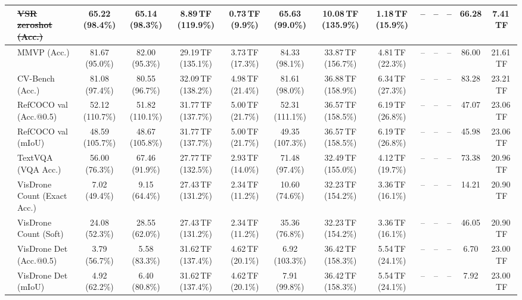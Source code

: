 \begin{table}[t]
\begin{center}
\begin{small}
\begin{sc}
{\begin{tabular}{llcccccccccccc}
& \sout{VSR zeroshot (Acc.)} & 65.22 (98.4\%) & 65.14 (98.3\%) & 8.89\,TF (119.9\%) & 0.73\,TF (9.9\%) & 65.63 (99.0\%) & 10.08\,TF (135.9\%) & 1.18\,TF (15.9\%) & -- & -- & -- & 66.28 & 7.41\,TF \\
\midrule
{}
& MMVP (Acc.) & 81.67 (95.0\%) & 82.00 (95.3\%) & 29.19\,TF (135.1\%) & 3.73\,TF (17.3\%) & 84.33 (98.1\%) & 33.87\,TF (156.7\%) & 4.81\,TF (22.3\%) & -- & -- & -- & 86.00 & 21.61\,TF \\
& CV-Bench (Acc.) & 81.08 (97.4\%) & 80.55 (96.7\%) & 32.09\,TF (138.2\%) & 4.98\,TF (21.4\%) & 81.61 (98.0\%) & 36.88\,TF (158.9\%) & 6.34\,TF (27.3\%) & -- & -- & -- & 83.28 & 23.21\,TF \\
& RefCOCO val (Acc.@0.5) & 52.12 (110.7\%) & 51.82 (110.1\%) & 31.77\,TF (137.7\%) & 5.00\,TF (21.7\%) & 52.31 (111.1\%) & 36.57\,TF (158.5\%) & 6.19\,TF (26.8\%) & -- & -- & -- & 47.07 & 23.06\,TF \\
& RefCOCO val (mIoU) & 48.59 (105.7\%) & 48.67 (105.8\%) & 31.77\,TF (137.7\%) & 5.00\,TF (21.7\%) & 49.35 (107.3\%) & 36.57\,TF (158.5\%) & 6.19\,TF (26.8\%) & -- & -- & -- & 45.98 & 23.06\,TF \\
& TextVQA (VQA Acc.) & 56.00 (76.3\%) & 67.46 (91.9\%) & 27.77\,TF (132.5\%) & 2.93\,TF (14.0\%) & 71.48 (97.4\%) & 32.49\,TF (155.0\%) & 4.12\,TF (19.7\%) & -- & -- & -- & 73.38 & 20.96\,TF \\
& VisDrone Count (Exact Acc.) & 7.02 (49.4\%) & 9.15 (64.4\%) & 27.43\,TF (131.2\%) & 2.34\,TF (11.2\%) & 10.60 (74.6\%) & 32.23\,TF (154.2\%) & 3.36\,TF (16.1\%) & -- & -- & -- & 14.21 & 20.90\,TF \\
& VisDrone Count (Soft) & 24.08 (52.3\%) & 28.55 (62.0\%) & 27.43\,TF (131.2\%) & 2.34\,TF (11.2\%) & 35.36 (76.8\%) & 32.23\,TF (154.2\%) & 3.36\,TF (16.1\%) & -- & -- & -- & 46.05 & 20.90\,TF \\
& VisDrone Det (Acc.@0.5) & 3.79 (56.7\%) & 5.58 (83.3\%) & 31.62\,TF (137.4\%) & 4.62\,TF (20.1\%) & 6.92 (103.3\%) & 36.42\,TF (158.3\%) & 5.54\,TF (24.1\%) & -- & -- & -- & 6.70 & 23.00\,TF \\
& VisDrone Det (mIoU) & 4.92 (62.2\%) & 6.40 (80.8\%) & 31.62\,TF (137.4\%) & 4.62\,TF (20.1\%) & 7.91 (99.8\%) & 36.42\,TF (158.3\%) & 5.54\,TF (24.1\%) & -- & -- & -- & 7.92 & 23.00\,TF \\

\end{tabular}}
\end{sc}
\end{small}
\end{center}
\end{table}
